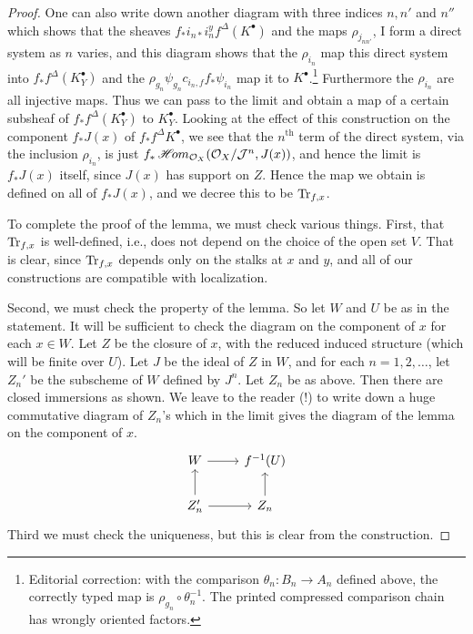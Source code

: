 \begin{proof}
One can also write down another diagram with three indices $n,n'$ and $n''$ which shows that the sheaves $f_*i_{n*}i_n^y f^\Delta(K^\bullet)$ and the maps $\rho_{j_{nn'}}$, I form a direct system as $n$ varies, and this diagram shows that the $\rho_{i_n}$ map this direct system into $f_*f^\Delta(K_Y^\bullet)$ and the $\rho_{g_n}\psi_{g_n}c_{i_n,f}f_*\psi_{i_n}$ map it to $K^\bullet$.\footnote{Editorial correction: with the comparison $\theta_n:B_n\to A_n$ defined above, the correctly typed map is $\rho_{g_n}\circ\theta_n^{-1}$. The printed compressed comparison chain has wrongly oriented factors.} Furthermore the $\rho_{i_n}$ are all injective maps. Thus we can pass to the limit and obtain a map of a certain subsheaf of $f_*f^\Delta(K_Y^\bullet)$ to $K_Y^\bullet$. Looking at the effect of this construction on the component $f_*J(x)$ of $f_*f^\Delta K^\bullet$, we see that the $n^{\text{th}}$ term of the direct system, via the inclusion $\rho_{i_n}$, is just $f_*\mathop{\mathscr{H}\!om}\nolimits_{\mathcal{O}_X}(\mathcal{O}_X/\mathcal{J}^n,J(x))$, and hence the limit is $f_*J(x)$ itself, since $J(x)$ has support on $Z$. Hence the map we obtain is defined on all of $f_*J(x)$, and we decree this to be $\operatorname{Tr}_{f,x}$.

To complete the proof of the lemma, we must check various things. First, that $\operatorname{Tr}_{f,x}$ is well-defined, i.e., does not depend on the choice of the open set $V$. That is clear, since $\operatorname{Tr}_{f,x}$ depends only on the stalks at $x$ and $y$, and all of our constructions are compatible with localization.

Second, we must check the property of the lemma. So let $W$ and $U$ be as in the statement. It will be sufficient to check the diagram on the component of $x$ for each $x\in W$. Let $Z$ be the closure of $x$, with the reduced induced structure (which will be finite over $U$). Let $J$ be the ideal of $Z$ in $W$, and for each $n=1,2,\ldots$, let $Z_n'$ be the subscheme of $W$ defined by $J^{n}$. Let $Z_n$ be as above. Then there are closed immersions as shown. We leave to the reader (!) to write down a huge commutative diagram of $Z_n$'s which in the limit gives the diagram of the lemma on the component of $x$.
\[\begin{tikzcd}
	W\ar[r]&f^{-1}(U)\\
	Z'_n\ar[r]\ar[u]&Z_n\ar[u]
\end{tikzcd}\]
Third we must check the uniqueness, but this is clear from the construction.
\end{proof}


